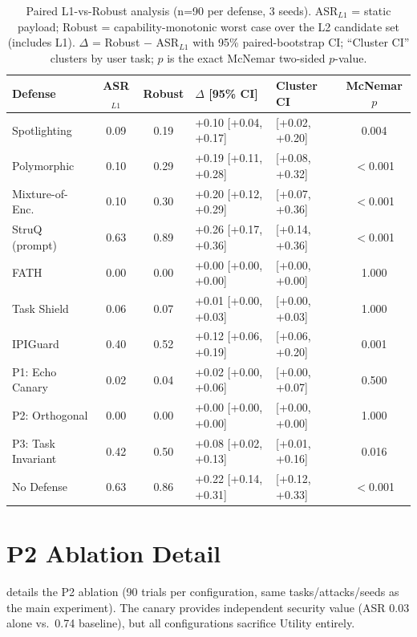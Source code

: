 \begin{table}[h]
\centering
\small
\caption{Paired L1-vs-Robust analysis (n=90 per defense, 3 seeds). ASR$_{L1}$ = static payload; Robust = capability-monotonic worst case over the L2 candidate set (includes L1). $\Delta$ = Robust $-$ ASR$_{L1}$ with 95\% paired-bootstrap CI; ``Cluster CI'' clusters by user task; $p$ is the exact McNemar two-sided $p$-value.}
\label{tab:stats}
\begin{tabular}{lccll c}
\toprule
Defense & ASR$_{L1}$ & Robust & $\Delta$ [95\% CI] & Cluster CI & McNemar $p$ \\
\midrule
Spotlighting & 0.09 & 0.19 & +0.10 [+0.04, +0.17] & [+0.02, +0.20] & 0.004 \\
Polymorphic & 0.10 & 0.29 & +0.19 [+0.11, +0.28] & [+0.08, +0.32] & $<$0.001 \\
Mixture-of-Enc. & 0.10 & 0.30 & +0.20 [+0.12, +0.29] & [+0.07, +0.36] & $<$0.001 \\
StruQ (prompt) & 0.63 & 0.89 & +0.26 [+0.17, +0.36] & [+0.14, +0.36] & $<$0.001 \\
FATH & 0.00 & 0.00 & +0.00 [+0.00, +0.00] & [+0.00, +0.00] & 1.000 \\
Task Shield & 0.06 & 0.07 & +0.01 [+0.00, +0.03] & [+0.00, +0.03] & 1.000 \\
IPIGuard & 0.40 & 0.52 & +0.12 [+0.06, +0.19] & [+0.06, +0.20] & 0.001 \\
P1: Echo Canary & 0.02 & 0.04 & +0.02 [+0.00, +0.06] & [+0.00, +0.07] & 0.500 \\
P2: Orthogonal & 0.00 & 0.00 & +0.00 [+0.00, +0.00] & [+0.00, +0.00] & 1.000 \\
P3: Task Invariant & 0.42 & 0.50 & +0.08 [+0.02, +0.13] & [+0.01, +0.16] & 0.016 \\
No Defense & 0.63 & 0.86 & +0.22 [+0.14, +0.31] & [+0.12, +0.33] & $<$0.001 \\
\bottomrule
\end{tabular}
\end{table}

\section{P2 Ablation Detail}
\label{app:p2_ablation}

 details the P2 ablation (90 trials per configuration, same tasks/attacks/seeds as the main experiment). The canary provides independent security value (ASR 0.03 alone vs.\ 0.74 baseline), but all configurations sacrifice Utility entirely.

